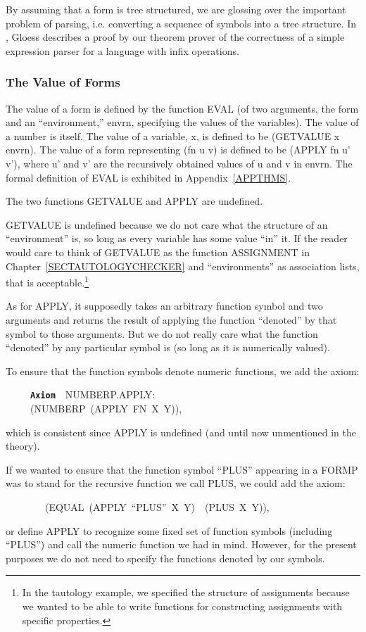 \documentclass[11pt]{book}
\newenvironment{pubasis}{\begin{flushleft}\ttfamily\small}{\normalsize\rmfamily\end{flushleft}}
\newcommand{\axiomordefinition}[1]{\vspace{6pt}\texttt{\textbf{#1}}}
\newcommand{\pubdefaulttextsize}{\large}
\begin{document}
By assuming that a form is tree structured, we are glossing
over the important problem of parsing, i.e. converting
a sequence of symbols into a tree structure.
In \cite{GLOESS}, Gloess describes a proof by our theorem
prover of the correctness of a simple expression parser for
a language with infix operations.
\subsubsection{The Value of Forms}
\pubdefaulttextsize
The value of a form is defined by the function EVAL (of two arguments, the
form and an ``environment,'' envrn, specifying the values of the variables).
The value of a number is itself.  The value of a variable, x, is
defined to be (GETVALUE x envrn).
The value of a form representing (fn u v) is defined to be
(APPLY fn u' v'), where u' and v' are the recursively
obtained values of u and v in envrn.
The formal definition of EVAL is exhibited
in Appendix~\ref{APPTHMS}.

The two functions GETVALUE and APPLY are undefined.

GETVALUE is undefined because we do not care what the structure
of an ``environment'' is, so long as every variable has some value ``in'' it.
If the reader would care to think of GETVALUE as the function ASSIGNMENT
in Chapter~\ref{SECTAUTOLOGYCHECKER} and ``environments'' as association lists,
that is acceptable.\footnote{In the tautology example, we specified the structure of assignments because we wanted to be able to write functions for constructing assignments with specific properties.}

As for APPLY, it supposedly takes an arbitrary function symbol
and two arguments and returns the result of applying the function ``denoted''
by that symbol to those arguments.  But we do not really care what
the function ``denoted'' by any particular symbol is (so long as it is
numerically valued).

To ensure that the function symbols denote
numeric functions, we add the axiom:
\begin{pubasis}
~~~~~\axiomordefinition{Axiom}~~NUMBERP.APPLY:\\
~~~~~(NUMBERP~(APPLY~FN~X~Y)),\\
\end{pubasis}
which is consistent since APPLY is undefined (and until now unmentioned
in the theory).

If we wanted to ensure that the function symbol ``PLUS'' appearing in
a FORMP was to stand for the recursive function we call PLUS, we could
add the axiom:
\begin{pubasis}
~~~~~~~~(EQUAL~(APPLY~``PLUS''~X~Y)~~(PLUS~X~Y)),\\
\end{pubasis}
or define APPLY to recognize some fixed set of function symbols
(including ``PLUS'') and call the numeric function we had
in mind.
However, for the present purposes we do not need to specify the
functions denoted by our symbols.
\end{document}

